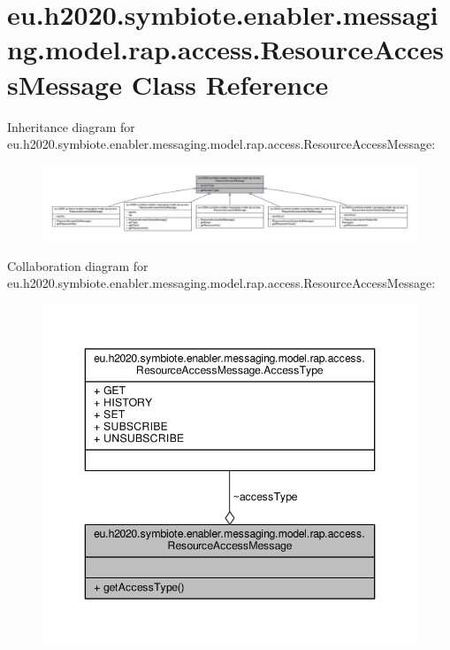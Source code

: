 \hypertarget{classeu_1_1h2020_1_1symbiote_1_1enabler_1_1messaging_1_1model_1_1rap_1_1access_1_1ResourceAccessMessage}{}\section{eu.\+h2020.\+symbiote.\+enabler.\+messaging.\+model.\+rap.\+access.\+Resource\+Access\+Message Class Reference}
\label{classeu_1_1h2020_1_1symbiote_1_1enabler_1_1messaging_1_1model_1_1rap_1_1access_1_1ResourceAccessMessage}


Inheritance diagram for eu.\+h2020.\+symbiote.\+enabler.\+messaging.\+model.\+rap.\+access.\+Resource\+Access\+Message\+:
\nopagebreak
\begin{figure}[H]
\begin{center}
\leavevmode
\includegraphics[width=350pt]{classeu_1_1h2020_1_1symbiote_1_1enabler_1_1messaging_1_1model_1_1rap_1_1access_1_1ResourceAccessMessage__inherit__graph}
\end{center}
\end{figure}


Collaboration diagram for eu.\+h2020.\+symbiote.\+enabler.\+messaging.\+model.\+rap.\+access.\+Resource\+Access\+Message\+:
\nopagebreak
\begin{figure}[H]
\begin{center}
\leavevmode
\includegraphics[width=346pt]{classeu_1_1h2020_1_1symbiote_1_1enabler_1_1messaging_1_1model_1_1rap_1_1access_1_1ResourceAccessMessage__coll__graph}
\end{center}
\end{figure}
